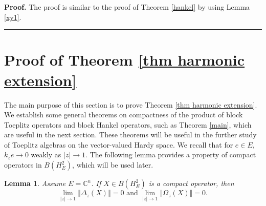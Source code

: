 \documentclass{article}%
\newtheorem{lemma}[theorem]{Lemma}
\newenvironment{proof}[1][Proof]{\noindent\textbf{#1.} }{\ \rule{0.5em}{0.5em}}
\begin{document}
\begin{proof}
The proof is similar to the proof of Theorem \ref{hankel} by using Lemma
\ref{xy1}.
\end{proof}

\section{Proof of Theorem \ref{thm harmonic extension}}

\label{Section 3} The main purpose of this section is to prove Theorem
\ref{thm harmonic extension}. We establish some general theorems on
compactness of the product of block Toeplitz operators and block Hankel
operators, such as Theorem \ref{main}, which are useful in the next section.
These theorems will be useful in the further study of Toeplitz algebras on the
vector-valued Hardy space. We recall that for $e\in E,$ $k_{z}e\rightarrow0$
weakly as $\left\vert z\right\vert \rightarrow1.$ The following lemma provides
a property of compact operators in $B(H_{E}^{2})$, which will be used later.

\begin{lemma}
\label{ness}Assume $E=\mathbb{C}^{n}$. If $X\in B(H_{E}^{2})$ is a compact operator, then%
\[
\lim_{\left\vert z\right\vert \rightarrow1}\left\Vert \Delta_{z}(X)\right\Vert
=0\text{ and }\lim_{\left\vert z\right\vert \rightarrow1}\left\Vert \Omega
_{z}(X)\right\Vert =0\text{.}%
\]

\end{lemma}
\end{document}
